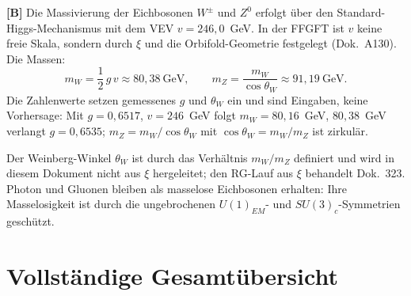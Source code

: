 \textbf{[B]} Die Massivierung der Eichbosonen $W^\pm$ und $Z^0$ erfolgt
über den Standard-Higgs-Mechanismus mit dem VEV $v = 246{,}0$~GeV.
In der FFGFT ist $v$ keine freie Skala, sondern durch $\xi$ und die
Orbifold-Geometrie festgelegt (Dok.~A130). Die Massen:
\begin{equation}
  m_W = \frac{1}{2}\,g\,v \approx 80{,}38~\text{GeV},\qquad
  m_Z = \frac{m_W}{\cos\theta_W} \approx 91{,}19~\text{GeV}.
  \label{eq:mWZ}
\end{equation}
Die Zahlenwerte setzen gemessenes $g$ und $\theta_W$ ein und sind
Eingaben, keine Vorhersage: Mit $g = 0{,}6517$, $v = 246$~GeV folgt
$m_W = 80{,}16$~GeV, $80{,}38$~GeV verlangt $g = 0{,}6535$;
$m_Z = m_W/\cos\theta_W$ mit $\cos\theta_W = m_W/m_Z$ ist zirkulär.

Der Weinberg-Winkel $\theta_W$ ist durch das Verhältnis $m_W/m_Z$
definiert und wird in diesem Dokument nicht aus $\xi$ hergeleitet;
den RG-Lauf aus $\xi$ behandelt Dok.~323. Photon und Gluonen bleiben als masselose Eichbosonen
erhalten: Ihre Masselosigkeit ist durch die ungebrochenen
$U(1)_{EM}$- und $SU(3)_c$-Symmetrien geschützt.

\section{Vollständige Gesamtübersicht}

